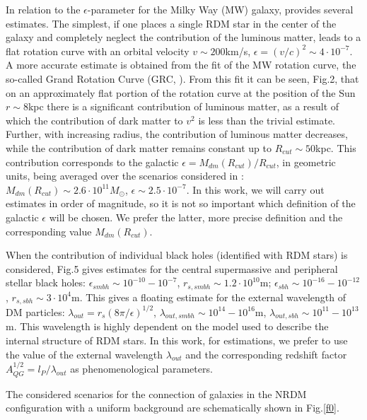 \documentclass{article}
\begin{document}
In relation to the $ \epsilon $-parameter for the Milky Way (MW) galaxy, \cite {bled2020} provides several estimates. The simplest, if one places a single RDM star in the center of the galaxy and completely neglect the contribution of the luminous matter, leads to a flat rotation curve with an orbital velocity $ v \sim200 $km/s, $ \epsilon = (v / c) ^ 2 \sim4 \cdot10 ^ {- 7} $. A more accurate estimate is obtained from the fit of the MW rotation curve, the so-called Grand Rotation Curve (GRC, \cite {VR2,0811.0859,0811.0860,1110.4431,1307.8241}). From this fit it can be seen, \cite {bled2020} Fig.2, that on an approximately flat portion of the rotation curve at the position of the Sun $ r \sim8 $kpc there is a significant contribution of luminous matter, as a result of which the contribution of dark matter to $ v ^ 2 $ is less than the trivial estimate. Further, with increasing radius, the contribution of luminous matter decreases, while the contribution of dark matter remains constant up to $ R_ {cut} \sim50 $kpc. This contribution corresponds to the galactic $ \epsilon = M_ {dm} (R_ {cut}) / R_ {cut} $, in geometric units, being averaged over the scenarios considered in \cite {bled2020}: $ M_ {dm} (R_ {cut} ) \sim2.6 \cdot10 ^ {11} M_ \odot $, $ \epsilon \sim2.5 \cdot10 ^ {- 7} $. In this work, we will carry out estimates in order of magnitude, so it is not so important which definition of the galactic $ \epsilon $ will be chosen. We prefer the latter, more precise definition and the corresponding value $ M_ {dm} (R_ {cut}) $.

When the contribution of individual black holes (identified with RDM stars) is considered, \cite {bled2020} Fig.5 gives estimates for the central supermassive and peripheral stellar black holes: $ \epsilon_ {smbh} \sim10 ^ {- 10} -10 ^ {- 7} $, $ r_ {s, smbh} \sim1.2 \cdot10 ^ {10} $m; $ \epsilon_ {sbh} \sim10 ^ {- 16} -10 ^ {- 12} $, $ r_ {s, sbh} \sim3 \cdot10 ^ 4 $m. This gives a floating estimate for the external wavelength of DM particles: $ \lambda_ {out} = r_s (8 \pi / \epsilon) ^ {1/2} $, $ \lambda_ {out, smbh} \sim10 ^ {14} -10 ^ {16} $m, $ \lambda_ {out, sbh} \sim10 ^ {11} -10 ^ {13} $m. This wavelength is highly dependent on the model used to describe the internal structure of RDM stars. In this work, for estimations, we prefer to use the value of the external wavelength $ \lambda_ {out} $ and the corresponding redshift factor $ A_ {QG} ^ {1/2} = l_P / \lambda_ {out} $ as phenomenological parameters.

The considered scenarios for the connection of galaxies in the NRDM configuration with a uniform background are schematically shown in Fig.\ref {f0}. 
\end{document}

